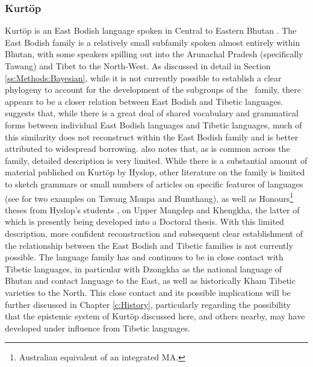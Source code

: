\subsubsection{Kurtöp}\label{sss:Discussion:KurtopCase}
Kurtöp is an East Bodish language spoken in Central to Eastern Bhutan \cite{Hyslop2017}. The East Bodish family is a relatively small subfamily spoken almost entirely within Bhutan, with some speakers spilling out into the Arunachal Pradesh (specifically Tawang) and Tibet to the North-West. As discussed in detail in Section \ref{ss:Methods:Bayesian}, while it is not currently possible to establish a clear phylogeny to account for the development of the subgroups of the \lfam\ family, there appears to be a closer relation between East Bodish and Tibetic languages.  suggests that, while there is a great deal of shared vocabulary and grammatical forms between individual East Bodish languages and Tibetic languages, much of this similarity does not reconstruct within the East Bodish family and is better attributed to widespread borrowing.  also notes that, as is common across the family, detailed description is very limited. While there is a substantial amount of material published on Kurtöp by Hyslop, other literature on the family is limited to sketch grammars or small numbers of articles on specific features of languages (see  for two examples on Tawang Monpa and Bumthang), as well as Honours\footnote{Australian equivalent of an integrated MA.} theses from Hyslop's students \cites{Bosch2016}{Hewitt2020}, on Upper Mangdep and Khengkha, the latter of which is presently being developed into a Doctoral thesis. With this limited description, more confident reconstruction and subsequent clear establishment of the relationship between the East Bodish and Tibetic families is not currently possible. The language family has and continues to be in close contact with Tibetic languages, in particular with Dzongkha as the national language of Bhutan and contact language to the East, as well as historically Kham Tibetic varieties to the North. This close contact and its possible implications will be further discussed in Chapter \ref{c:History}, particularly regarding the possibility that the epistemic system of Kurtöp discussed here, and others nearby, may have developed under influence from Tibetic languages.

